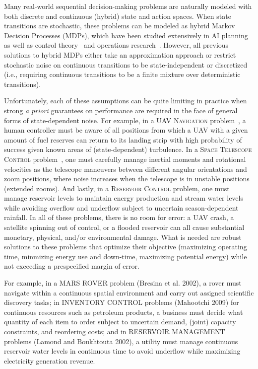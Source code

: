 
Many real-world sequential decision-making problems are naturally
modeled with both discrete and continuous (hybrid) state and action
spaces.  When state transitions are stochastic, these problems can be
modeled as hybrid Markov Decision Processes (MDPs), which have been
studied extensively in AI
planning~\cite{boyan01,feng04,li05,kveton06,phase07,hao09,zamani_aaai12}
as well as control theory~\cite{} and operations
research~\cite{puterman}.  However, all previous solutions to hybrid
MDPs either take an approximation approach or restrict stochastic
noise on continuous transitions to be state-independent or discretized
(i.e., requiring continuous transitions to be a finite mixture over
deterministic transitions).

Unfortunately, each of these assumptions can be quite limiting in
practice when strong \emph{a priori} guarantees on performance are
required in the face of general forms of state-dependent noise.  For
example, in a \textsc{UAV Navigation} problem~\cite{}, a human
controller must be aware of all positions from which a UAV with a
given amount of fuel reserves can return to its landing strip with
high probability of success given known areas of (state-dependent)
turbulence.  In a \textsc{Space Telescope Control} problem~\cite{},
one must carefully manage inertial moments and rotational velocities
as the telescope maneuvers between different angular orientations and
zoom positions, where noise increases when the telescope is in
unstable positions (extended zooms).  And lastly, in
a \textsc{Reservoir Control} problem, one must manage reservoir levels
to maintain energy production and stream water levels while avoiding
overflow and underflow subject to uncertain season-dependent rainfall.
In all of these problems, there is no room for error: a UAV crash, a
satellite spinning out of control, or a flooded reservoir can all
cause substantial monetary, physical, and/or environmental damage.
What is needed are robust solutions to these problems that optimize
their objective (maximizing operating time, minmizing energy use and
down-time, maximizing potential energy) while not exceeding a
prespecified margin of error.


For example, in a MARS ROVER problem (Bresina et al.
2002), a rover must navigate within a continuous spatial environment and carry out assigned scientiﬁc discovery tasks;
in INVENTORY CONTROL problems (Mahootchi 2009) for
continuous resources such as petroleum products, a business
must decide what quantity of each item to order subject to
uncertain demand, (joint) capacity constraints, and reordering costs; and in RESERVOIR MANAGEMENT problems (Lamond and Boukhtouta 2002), a utility must manage continuous reservoir water levels in continuous time to avoid underﬂow while maximizing electricity generation revenue. 


